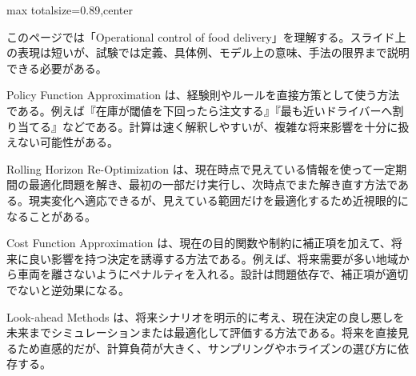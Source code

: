 \begin{minipage}[t]{0.58\textwidth}
\begin{adjustbox}{max totalsize={\textwidth}{0.89\textheight},center}
\begin{minipage}{\textwidth}\scriptsize
{}このページでは「Operational control of food delivery」を理解する。スライド上の表現は短いが、試験では定義、具体例、モデル上の意味、手法の限界まで説明できる必要がある。\par
Policy Function Approximation は、経験則やルールを直接方策として使う方法である。例えば『在庫が閾値を下回ったら注文する』『最も近いドライバーへ割り当てる』などである。計算は速く解釈しやすいが、複雑な将来影響を十分に扱えない可能性がある。\par
Rolling Horizon Re-Optimization は、現在時点で見えている情報を使って一定期間の最適化問題を解き、最初の一部だけ実行し、次時点でまた解き直す方法である。現実変化へ適応できるが、見えている範囲だけを最適化するため近視眼的になることがある。\par
Cost Function Approximation は、現在の目的関数や制約に補正項を加えて、将来に良い影響を持つ決定を誘導する方法である。例えば、将来需要が多い地域から車両を離さないようにペナルティを入れる。設計は問題依存で、補正項が適切でないと逆効果になる。\par
Look-ahead Methods は、将来シナリオを明示的に考え、現在決定の良し悪しを未来までシミュレーションまたは最適化して評価する方法である。将来を直接見るため直感的だが、計算負荷が大きく、サンプリングやホライズンの選び方に依存する。\par

\end{minipage}
\end{adjustbox}
\end{minipage}
